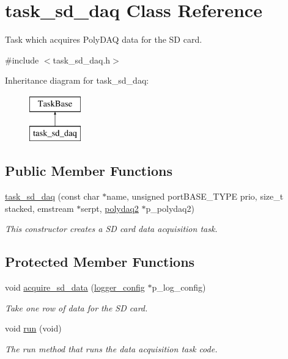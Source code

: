 \hypertarget{classtask__sd__daq}{\section{task\-\_\-sd\-\_\-daq Class Reference}
\label{classtask__sd__daq}
}


Task which acquires Poly\-D\-A\-Q data for the S\-D card.  




{\ttfamily \#include $<$task\-\_\-sd\-\_\-daq.\-h$>$}

Inheritance diagram for task\-\_\-sd\-\_\-daq\-:\begin{figure}[H]
\begin{center}
\leavevmode
\includegraphics[height=2.000000cm]{classtask__sd__daq}
\end{center}
\end{figure}
\subsection*{Public Member Functions}
\begin{DoxyCompactItemize}
\item 
\hyperlink{classtask__sd__daq_ac8550bd7c6e2868ca47699056fc3af25}{task\-\_\-sd\-\_\-daq} (const char $\ast$name, unsigned port\-B\-A\-S\-E\-\_\-\-T\-Y\-P\-E prio, size\-\_\-t stacked, emstream $\ast$serpt, \hyperlink{classpolydaq2}{polydaq2} $\ast$p\-\_\-polydaq2)
\begin{DoxyCompactList}\small\item\em This constructor creates a S\-D card data acquisition task. \end{DoxyCompactList}\end{DoxyCompactItemize}
\subsection*{Protected Member Functions}
\begin{DoxyCompactItemize}
\item 
void \hyperlink{classtask__sd__daq_a0c3a781def3c1de43ab9c66ac89869e0}{acquire\-\_\-sd\-\_\-data} (\hyperlink{classlogger__config}{logger\-\_\-config} $\ast$p\-\_\-log\-\_\-config)
\begin{DoxyCompactList}\small\item\em Take one row of data for the S\-D card. \end{DoxyCompactList}\item 
void \hyperlink{classtask__sd__daq_a83e5968bd2d7b812a68560f703492445}{run} (void)
\begin{DoxyCompactList}\small\item\em The run method that runs the data acquisition task code. \end{DoxyCompactList}\end{DoxyCompactItemize}
